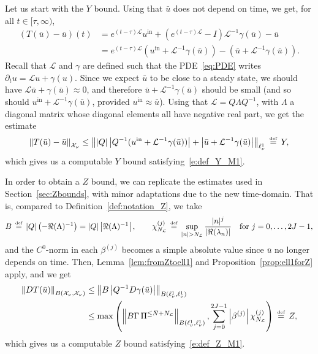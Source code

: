 \documentclass[10pt,a4paper]{article}
\theoremstyle{plain}
\renewcommand{\L}{\mathcal{L}}
\newcommand{\X}{\mathcal{X}}
\newcommand{\bu}{\bar{u}}
\newcommand{\bN}{\bar{N}}
\newcommand{\1}{\mathbf{1}}
\newcommand{\uin}{{u^{\mathrm{in}}}}
\newcommand{\bydef}{\,\stackrel{\mbox{\tiny\textnormal{\raisebox{0ex}[0ex][0ex]{def}}}}{=}\,}
\newcommand{\NL}{N_{\text{\tiny{$\L$}}}}
\begin{document}
Let us start with the $Y$ bound. Using that $\bu$ does not depend on time, we get, for all $t\in[\tau,\infty)$,
\begin{align}
\label{eq:Tu-u_cste}
\left(T(\bu)-\bu\right)(t) &= e^{(t-\tau)\L}\uin + \left(e^{(t-\tau)\L}-I\right)\L^{-1}\gamma(\bu) - \bu \nonumber\\
&= e^{(t-\tau)\L}\left(\uin+\L^{-1}\gamma(\bu)\right) - \left(\bu + \L^{-1}\gamma(\bu)\right).
\end{align}
Recall that $\L$ and $\gamma$ are defined such that the PDE~\eqref{eq:PDE} writes $\partial_t u = \L u + \gamma(u)$. Since we expect $\bu$ to be close to a steady state, we should have $\L\bu + \gamma(\bu) \approx 0$, and therefore $\bu + \L^{-1}\gamma(\bu)$ should be small (and so should $\uin + \L^{-1}\gamma(\bu)$, provided $\uin\approx \bu$). Using that $\L = Q\Lambda Q^{-1}$, with $\Lambda$ a diagonal matrix whose diagonal elements all have negative real part, we get the estimate
\begin{align}
\label{eq:Yinfty}
\left\Vert T(\bu)-\bu\right\Vert_{\X_\nu} \leq \left\Vert \vert Q\vert \left\vert Q^{-1}(\uin+\L^{-1}\gamma(\bu))\right\vert + \left\vert \bu + \L^{-1}\gamma(\bu)\right\vert \right\Vert_{\ell^1_\nu} \bydef Y,
\end{align}
which gives us a computable $Y$ bound satisfying~\eqref{e:def_Y_M1}.

In order to obtain a $Z$ bound, we can replicate the estimates used in Section~\ref{sec:Zbounds}, with minor adaptations due to the new time-domain. That is, compared to Definition~\ref{def:notation_Z}, we take
\begin{align*}
B\bydef \vert Q\vert  \left(-\Re(\Lambda)^{-1}\right) = \vert Q\vert  \left\vert\Re(\Lambda)^{-1}\right\vert,\qquad \chi^{(j)}_{\NL} \bydef \sup\limits_{\vert n\vert >\NL} \frac{\vert n\vert^j}{\vert \Re(\lambda_n)\vert} \quad\text{for }j=0,\ldots,2J-1,
\end{align*} 
and the $C^0$-norm in each $\beta^{(j)}$ becomes a simple absolute value since $\bu$ no longer depends on time. Then, Lemma~\ref{lem:fromZtoell1} and Proposition~\ref{prop:ell1forZ} apply, and we get
\begin{align}
\label{eq:Zinfty}
\left\Vert DT(\bu)\right\Vert_{B(\X_\nu,\X_\nu)} &\leq \left\Vert B \left\vert Q^{-1} D\gamma(\bu) \right\vert \right\Vert_{B(\ell^1_\nu,\ell^1_\nu)} \nonumber \\
&\leq \max\left( \left\Vert B\Gamma \, \Pi^{\leq \bN+\NL} \right\Vert_{B(\ell^1_\nu,\ell^1_\nu)}, \sum_{j=0}^{2J-1} \left\vert \beta^{(j)}\right\vert \chi^{(j)}_{\NL}\right) \bydef Z,
\end{align}
which gives us a computable $Z$ bound satisfying~\eqref{e:def_Z_M1}.
\end{document}
